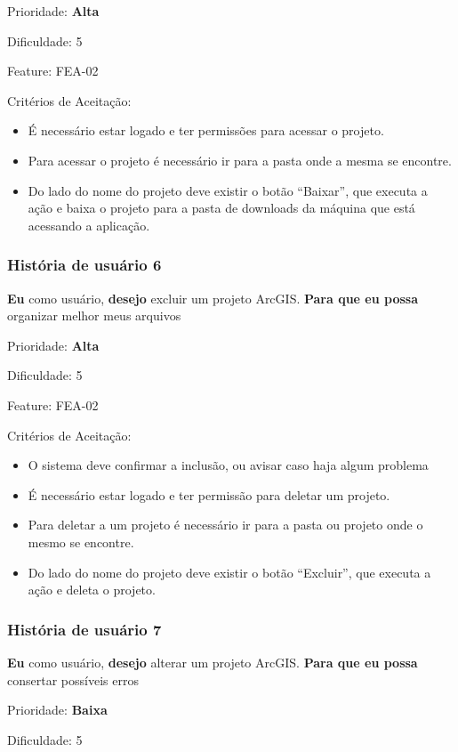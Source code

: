     Prioridade: \textbf{Alta}

    Dificuldade: 5

    Feature: FEA-02

    Critérios de Aceitação:
    \begin{itemize}
      \item É necessário estar logado e ter permissões para acessar o projeto. 
      \item Para acessar o projeto é necessário ir para a pasta onde a mesma se encontre.
      \item Do lado do nome do projeto deve existir o botão “Baixar”, que executa a ação e baixa o projeto para a pasta de downloads da máquina que está acessando a aplicação.
    \end{itemize}

  \subsubsection{História de usuário 6}
    \textbf{Eu} como usuário, \textbf{desejo} excluir um projeto ArcGIS. \textbf{Para que eu possa} organizar melhor meus arquivos

    Prioridade: \textbf{Alta}

    Dificuldade: 5

    Feature: FEA-02

    Critérios de Aceitação:
    \begin{itemize}
      \item O sistema deve confirmar a inclusão, ou avisar caso haja algum problema
      \item É necessário estar logado e ter permissão para deletar um projeto. 
      \item Para deletar a  um projeto é necessário ir para a pasta ou projeto onde o mesmo se encontre.
      \item Do lado do nome do projeto deve existir o botão “Excluir”, que executa a ação e deleta o projeto.
    \end{itemize}

  \subsubsection{História de usuário 7}
    \textbf{Eu} como usuário, \textbf{desejo} alterar um projeto ArcGIS. \textbf{Para que eu possa} consertar possíveis erros

    Prioridade: \textbf{Baixa}

    Dificuldade: 5


